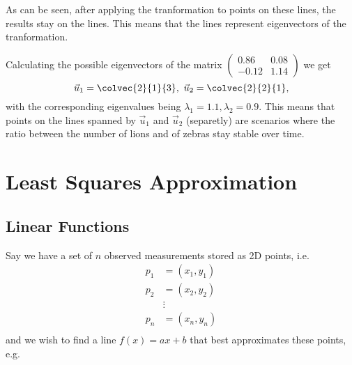 As can be seen, after applying the tranformation to points on these lines, the results stay on the lines. This means that the lines represent eigenvectors of the tranformation.

Calculating the possible eigenvectors of the matrix $\begin{pmatrix} 0.86 & 0.08 \\ -0.12 & 1.14 \end{pmatrix}$ we get
\begin{equation*}
  \vec{u}_{1} = \colvec{2}{1}{3},\ \vec{u}_{2}=\colvec{2}{2}{1},
\end{equation*}
with the corresponding eigenvalues being $\lambda_{1}=1.1, \lambda_{2}=0.9$. This means that points on the lines spanned by $\vec{u}_{1}$ and $\vec{u}_{2}$ (separetly) are scenarios where the ratio between the number of lions and of zebras stay stable over time.

\section{Least Squares Approximation}
\subsection{Linear Functions}
Say we have a set of $n$ observed measurements stored as 2D points, i.e.
\begin{align*}
  p_{1} &= \left( x_{1}, y_{1} \right)\\
  p_{2} &= \left( x_{2}, y_{2} \right)\\
  &\vdots\\
  p_{n} &= \left( x_{n}, y_{n} \right)\\
\end{align*}
and we wish to find a line $f(x)=ax+b$ that best approximates these points, e.g.


\begin{figure}[H]
  \centering
\end{figure}

